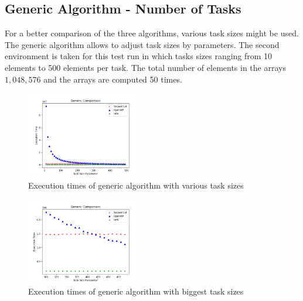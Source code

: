 \subsection{Generic Algorithm - Number of Tasks}
For a better comparison of the three algorithms, various task sizes might be used.
The generic algorithm allows to adjust task sizes by parameters.
The second environment is taken for this test run in which tasks sizes ranging from 10 elements to 500 elements per task.
The total number of elements in the arrays \(1,048,576\) and the arrays are computed 50 times.
\begin{figure}[h]
	\centering
	\includegraphics[width=0.45\textwidth]{figures/genericComp.png}
	\caption{Execution times of generic algorithm with various task sizes}
	\label{fig:genComp}
\end{figure}

\begin{figure}[h]
	\centering
	\includegraphics[width=0.45\textwidth]{figures/genericCompLast.png}
	\caption{Execution times of generic algorithm with biggest task sizes}
	\label{fig:genComp_Last}
\end{figure}

